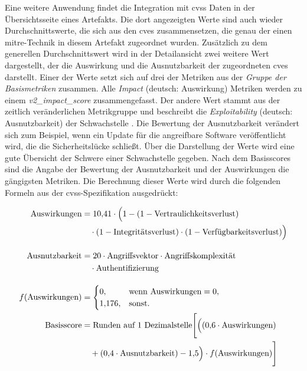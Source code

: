 \par Eine weitere Anwendung findet die Integration mit \gls{cvss} Daten in der Übersichtsseite eines Artefakts. Die dort angezeigten Werte sind auch wieder Durchschnittswerte, die sich aus den \glspl{cve} zusammensetzen, die genau der einen \gls{mitre}-Technik in diesem Artefakt zugeordnet wurden. Zusätzlich zu dem generellen Durchschnittswert wird in der Detailansicht zwei weitere Wert dargestellt, der die Auswirkung und die Ausnutzbarkeit der zugeordneten \glspl{cve} darstellt. Einer der Werte setzt sich auf drei der Metriken aus der \textit{Gruppe der Basismetriken} zusammen. Alle \textit{Impact} (deutsch: Auswirkung) Metriken werden zu einem \textit{v2\_impact\_score} zusammengefasst. Der andere Wert stammt aus der zeitlich veränderlichen Metrikgruppe und beschreibt die \textit{Exploitability} (deutsch: Ausnutzbarkeit) der Schwachstelle \autocite{CVSSV2Complete}. Die Bewertung der Ausnutzbarkeit verändert sich zum Beispiel, wenn ein Update für die angreifbare Software veröffentlicht wird, die die Sicherheitslücke schließt.
Über die Darstellung der Werte wird eine gute Übersicht der Schwere einer Schwachstelle gegeben. Nach dem Basisscores sind die Angabe der Bewertung der Ausnutzbarkeit und der Auswirkungen die gängigsten Metriken. Die Berechnung dieser Werte wird durch die folgenden Formeln aus der \gls{cvss}-Spezifikation ausgedrückt:

\begin{align*}
    \text{Auswirkungen}    & = 10{,}41 \cdot \Big( 1
    - (1 - \text{Vertraulichkeitsverlust}) \notag                                      \\
                           & \quad \cdot (1 - \text{Integritätsverlust})
    \cdot (1 - \text{Verfügbarkeitsverlust}) \Big) \notag                              \\[10pt]
    \text{Ausnutzbarkeit}  & = 20 \cdot \text{Angriffsvektor}
    \cdot \text{Angriffskomplexität} \notag                                            \\
                           & \quad \cdot \text{Authentifizierung} \notag               \\[10pt]
    f(\text{Auswirkungen}) & =
    \begin{cases}
        0,       & \text{wenn Auswirkungen} = 0, \\
        1{,}176, & \text{sonst.}
    \end{cases}                                           \\
    \text{Basisscore}      & = \text{Runden auf 1 Dezimalstelle} \Bigg[ \Big(
    (0{,}6 \cdot \text{Auswirkungen}) \notag                                           \\
                           & \quad + (0{,}4 \cdot \text{Ausnutzbarkeit}) - 1{,}5 \Big)
    \cdot f(\text{Auswirkungen}) \Bigg] \notag                                         \\[10pt]
\end{align*}


